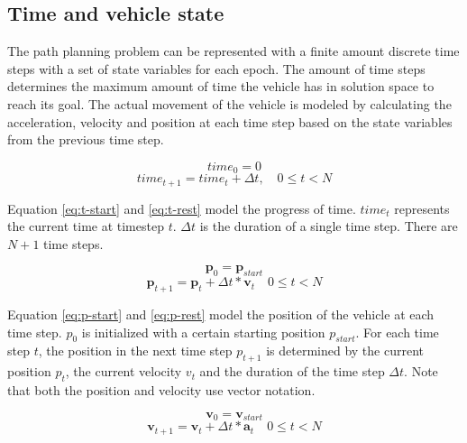 \subsection{Time and vehicle state}
\label{section:modeling}

The path planning problem can be represented with a finite amount discrete time steps with a set of state variables for each epoch. The amount of time steps determines the maximum amount of time the vehicle has in solution space to reach its goal. The actual movement of the vehicle is modeled by calculating the acceleration, velocity and position at each time step based on the state variables from the previous time step.

\begin{equation}
\label{eq:t-start}
time_0 = 0
\end{equation}
\begin{equation}
\label{eq:t-rest}
time_{t+1} = time_{t} + \Delta t,  \quad 0 \leq t < N
\end{equation}

Equation \ref{eq:t-start} and \ref{eq:t-rest} model the progress of time. $time_t$ represents the current time at timestep $t$. $\Delta t$ is the duration of a single time step. There are $N + 1$ time steps.


\begin{equation}
\label{eq:p-start}
\boldsymbol{p}_0 = \boldsymbol{p}_{start}
\end{equation}
\begin{equation}
\label{eq:p-rest}
\boldsymbol{p}_{t+1} = \boldsymbol{p}_{t} + \Delta t * \boldsymbol{v}_{t}  \quad 0 \leq t < N
\end{equation}

Equation \ref{eq:p-start} and \ref{eq:p-rest} model the position of the vehicle at each time step. $p_0$ is initialized with a certain starting position $p_{start}$. For each time step $t$, the position in the next time step $p_{t+1}$ is determined by the current position $p_t$, the current velocity $v_t$ and the duration of the time step $\Delta t$. Note that both the position and velocity use vector notation.

\begin{equation}
\label{eq:v-start}
\boldsymbol{v}_0 =\boldsymbol{v}_{start}
\end{equation}
\begin{equation}
\label{eq:v-rest}
\boldsymbol{v}_{t+1} =\boldsymbol{v}_{t} + \Delta t * \boldsymbol{a}_{t}  \quad 0 \leq t < N
\end{equation}

